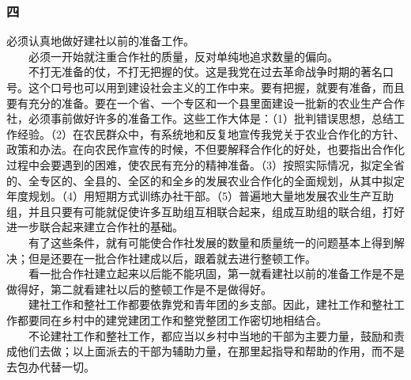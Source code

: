 \documentclass[cn,11pt,chinese]{elegantbook}
\def\myformat#1{\hfil\hfil #1}
\begin{document}
\subsubsection*{\myformat{四}}
必须认真地做好建社以前的准备工作。\\
　　必须一开始就注重合作社的质量，反对单纯地追求数量的偏向。\\
　　不打无准备的仗，不打无把握的仗。这是我党在过去革命战争时期的著名口号。这个口号也可以用到建设社会主义的工作中来。要有把握，就要有准备，而且要有充分的准备。要在一个省、一个专区和一个县里面建设一批新的农业生产合作社，必须事前做好许多的准备工作。这些工作大体是：（1）批判错误思想，总结工作经验。（2）在农民群众中，有系统地和反复地宣传我党关于农业合作化的方针、政策和办法。在向农民作宣传的时候，不但要解释合作化的好处，也要指出合作化过程中会要遇到的困难，使农民有充分的精神准备。（3）按照实际情况，拟定全省的、全专区的、全县的、全区的和全乡的发展农业合作化的全面规划，从其中拟定年度规划。（4）用短期方式训练办社干部。（5）普遍地大量地发展农业生产互助组，并且只要有可能就促使许多互助组互相联合起来，组成互助组的联合组，打好进一步联合起来建立合作社的基础。\\
　　有了这些条件，就有可能使合作社发展的数量和质量统一的问题基本上得到解决；但是还要在一批合作社建成以后，跟着就去进行整顿工作。\\
　　看一批合作社建立起来以后能不能巩固，第一就看建社以前的准备工作是不是做得好，第二就看建社以后的整顿工作是不是做得好。\\
　　建社工作和整社工作都要依靠党和青年团的乡支部。因此，建社工作和整社工作都要同在乡村中的建党建团工作和整党整团工作密切地相结合。\\
　　不论建社工作和整社工作，都应当以乡村中当地的干部为主要力量，鼓励和责成他们去做；以上面派去的干部为辅助力量，在那里起指导和帮助的作用，而不是去包办代替一切。\\
\end{document}
